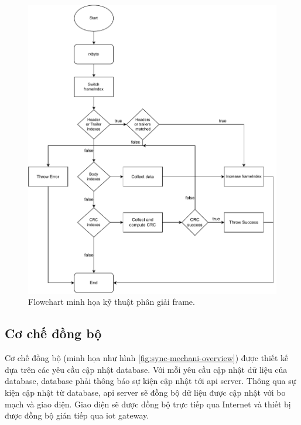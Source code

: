 \begin{figure}[htp]
\centering
\includegraphics[width=1.0\linewidth]{images/Thesis-Page-5-Frame-Parsing-Tech.pdf}
\caption{Flowchart minh họa kỹ thuật phân giải frame.}
\label{fig:frame-parsing-tech}
\end{figure}

\subsection{Cơ chế đồng bộ}
\label{VSync-Mecha}

Cơ chế đồng bộ (minh họa như hình \ref{fig:sync-mechani-overview}) được thiết kế dựa trên các yêu cầu cập nhật database. Với mỗi yêu cầu cập nhật dữ liệu của database, database phải thông báo sự kiện cập nhật tới \acrshort{api} server. Thông qua sự kiện cập nhật từ database, \acrshort{api} server sẽ đồng bộ dữ liệu được cập nhật với bo mạch và giao diện. Giao diện sẽ được đồng bộ trực tiếp qua Internet và thiết bị được đồng bộ gián tiếp qua \acrshort{iot} gateway.

